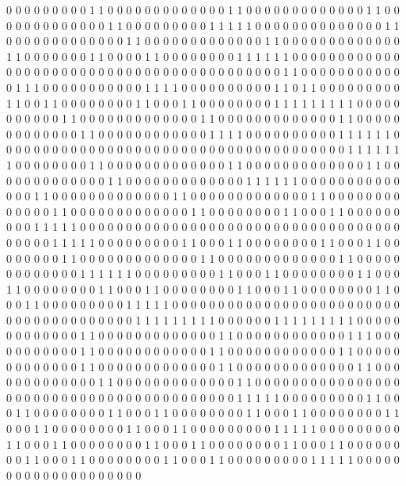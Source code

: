 0 0 0 0 0 0 0 0 0 1 1 0 0 0 0
0 0 0 0 0 0 0 0 0 1 1 0 0 0 0
0 0 0 0 0 0 0 0 0 1 1 0 0 0 0
0 0 0 0 0 0 0 0 0 1 1 0 0 0 0
0 0 0 0 0 1 1 1 1 1 0 0 0 0 0
0 0 0 0 0 0 0 0 0 1 1 0 0 0 0
0 0 0 0 0 0 0 0 0 1 1 0 0 0 0
0 0 0 0 0 0 0 0 0 1 1 0 0 0 0
0 0 0 0 0 0 0 0 0 1 1 0 0 0 0
0 0 0 1 1 0 0 0 0 1 1 0 0 0 0
0 0 0 0 1 1 1 1 1 1 0 0 0 0 0
0 0 0 0 0 0 0 0 0 0 0 0 0 0 0
0 0 0 0 0 0 0 0 0 0 0 0 0 0 0
0 0 0 0 0 0 0 1 1 0 0 0 0 0 0
0 0 0 0 0 0 1 1 1 0 0 0 0 0 0
0 0 0 0 0 1 1 1 1 0 0 0 0 0 0
0 0 0 0 1 1 0 1 1 0 0 0 0 0 0
0 0 0 1 1 0 0 1 1 0 0 0 0 0 0
0 0 1 1 0 0 0 1 1 0 0 0 0 0 0
0 0 1 1 1 1 1 1 1 1 1 0 0 0 0
0 0 0 0 0 0 0 1 1 0 0 0 0 0 0
0 0 0 0 0 0 0 1 1 0 0 0 0 0 0
0 0 0 0 0 0 0 1 1 0 0 0 0 0 0
0 0 0 0 0 0 0 1 1 0 0 0 0 0 0
0 0 0 0 0 0 1 1 1 1 0 0 0 0 0
0 0 0 0 0 1 1 1 1 1 1 0 0 0 0
0 0 0 0 0 0 0 0 0 0 0 0 0 0 0
0 0 0 0 0 0 0 0 0 0 0 0 0 0 0
0 0 0 0 1 1 1 1 1 1 1 0 0 0 0
0 0 0 0 1 1 0 0 0 0 0 0 0 0 0
0 0 0 0 1 1 0 0 0 0 0 0 0 0 0
0 0 0 0 1 1 0 0 0 0 0 0 0 0 0
0 0 0 0 1 1 0 0 0 0 0 0 0 0 0
0 0 0 0 1 1 1 1 1 1 0 0 0 0 0
0 0 0 0 0 0 0 0 0 1 1 0 0 0 0
0 0 0 0 0 0 0 0 0 1 1 0 0 0 0
0 0 0 0 0 0 0 0 0 1 1 0 0 0 0
0 0 0 0 0 0 0 0 0 1 1 0 0 0 0
0 0 0 0 0 0 0 0 0 1 1 0 0 0 0
0 0 0 0 1 1 0 0 0 1 1 0 0 0 0
0 0 0 0 0 1 1 1 1 1 0 0 0 0 0
0 0 0 0 0 0 0 0 0 0 0 0 0 0 0
0 0 0 0 0 0 0 0 0 0 0 0 0 0 0
0 0 0 0 0 1 1 1 1 1 0 0 0 0 0
0 0 0 0 1 1 0 0 0 1 1 0 0 0 0
0 0 0 0 1 1 0 0 0 1 1 0 0 0 0
0 0 0 0 1 1 0 0 0 0 0 0 0 0 0
0 0 0 0 1 1 0 0 0 0 0 0 0 0 0
0 0 0 0 1 1 0 0 0 0 0 0 0 0 0
0 0 0 0 1 1 1 1 1 1 0 0 0 0 0
0 0 0 0 1 1 0 0 0 1 1 0 0 0 0
0 0 0 0 1 1 0 0 0 1 1 0 0 0 0
0 0 0 0 1 1 0 0 0 1 1 0 0 0 0
0 0 0 0 1 1 0 0 0 1 1 0 0 0 0
0 0 0 0 1 1 0 0 0 1 1 0 0 0 0
0 0 0 0 0 1 1 1 1 1 0 0 0 0 0
0 0 0 0 0 0 0 0 0 0 0 0 0 0 0
0 0 0 0 0 0 0 0 0 0 0 0 0 0 0
0 0 0 0 1 1 1 1 1 1 1 1 1 0 0
0 0 0 0 1 1 1 1 1 1 1 1 1 0 0
0 0 0 0 0 0 0 0 0 0 0 1 1 0 0
0 0 0 0 0 0 0 0 0 0 0 1 1 0 0
0 0 0 0 0 0 0 0 0 0 1 1 1 0 0
0 0 0 0 0 0 0 0 0 1 1 0 0 0 0
0 0 0 0 0 0 0 0 1 1 0 0 0 0 0
0 0 0 0 0 0 0 1 1 0 0 0 0 0 0
0 0 0 0 0 0 0 1 1 0 0 0 0 0 0
0 0 0 0 0 0 0 1 1 0 0 0 0 0 0
0 0 0 0 0 0 0 1 1 0 0 0 0 0 0
0 0 0 0 0 0 0 1 1 0 0 0 0 0 0
0 0 0 0 0 0 0 1 1 0 0 0 0 0 0
0 0 0 0 0 0 0 0 0 0 0 0 0 0 0
0 0 0 0 0 0 0 0 0 0 0 0 0 0 0
0 0 0 0 0 1 1 1 1 1 0 0 0 0 0
0 0 0 0 1 1 0 0 0 1 1 0 0 0 0
0 0 0 0 1 1 0 0 0 1 1 0 0 0 0
0 0 0 0 1 1 0 0 0 1 1 0 0 0 0
0 0 0 0 1 1 0 0 0 1 1 0 0 0 0
0 0 0 0 1 1 0 0 0 1 1 0 0 0 0
0 0 0 0 0 1 1 1 1 1 0 0 0 0 0
0 0 0 0 1 1 0 0 0 1 1 0 0 0 0
0 0 0 0 1 1 0 0 0 1 1 0 0 0 0
0 0 0 0 1 1 0 0 0 1 1 0 0 0 0
0 0 0 0 1 1 0 0 0 1 1 0 0 0 0
0 0 0 0 1 1 0 0 0 1 1 0 0 0 0
0 0 0 0 0 1 1 1 1 1 0 0 0 0 0
0 0 0 0 0 0 0 0 0 0 0 0 0 0 0

